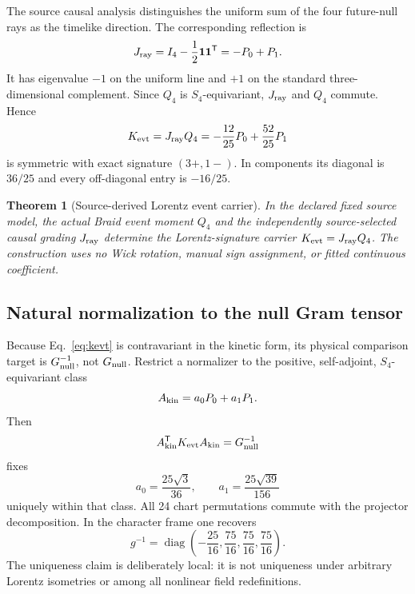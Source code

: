 \documentclass[11pt]{article}
\newtheorem{theorem}{Theorem}[section]
\theoremstyle{definition}
\theoremstyle{remark}
\begin{document}
The source causal analysis distinguishes the uniform sum of the four future-null rays as the timelike direction. The corresponding reflection is
\begin{equation}\label{eq:jray}
 J_{\rm ray}=I_4-\frac12\mathbf1\mathbf1^{\mathsf T}
 =-P_0+P_1.
\end{equation}
It has eigenvalue $-1$ on the uniform line and $+1$ on the standard three-dimensional complement. Since $Q_4$ is $S_4$-equivariant, $J_{\rm ray}$ and $Q_4$ commute. Hence
\begin{equation}\label{eq:kevt}
 K_{\rm evt}=J_{\rm ray}Q_4
 =-\frac{12}{25}P_0+\frac{52}{25}P_1
\end{equation}
is symmetric with exact signature $(3+,1-)$. In components its diagonal is $36/25$ and every off-diagonal entry is $-16/25$.

\begin{theorem}[Source-derived Lorentz event carrier]\label{thm:carrier}
In the declared fixed source model, the actual Braid event moment $Q_4$ and the independently source-selected causal grading $J_{\rm ray}$ determine the Lorentz-signature carrier $K_{\rm evt}=J_{\rm ray}Q_4$. The construction uses no Wick rotation, manual sign assignment, or fitted continuous coefficient.
\end{theorem}

\subsection{Natural normalization to the null Gram tensor}

Because Eq.~\eqref{eq:kevt} is contravariant in the kinetic form, its physical comparison target is $G_{\rm null}^{-1}$, not $G_{\rm null}$. Restrict a normalizer to the positive, self-adjoint, $S_4$-equivariant class
\begin{equation}
 A_{\rm kin}=a_0P_0+a_1P_1.
\end{equation}
Then
\begin{equation}
 A_{\rm kin}^{\mathsf T}K_{\rm evt}A_{\rm kin}=G_{\rm null}^{-1}
\end{equation}
fixes
\begin{equation}
 a_0=\frac{25\sqrt3}{36},\qquad
 a_1=\frac{25\sqrt{39}}{156}
\end{equation}
uniquely within that class. All 24 chart permutations commute with the projector decomposition. In the character frame one recovers
\begin{equation}
 g^{-1}=\operatorname{diag}\!\left(
 -\frac{25}{16},\frac{75}{16},\frac{75}{16},\frac{75}{16}
 \right).
\end{equation}
The uniqueness claim is deliberately local: it is not uniqueness under arbitrary Lorentz isometries or among all nonlinear field redefinitions.
\end{document}
